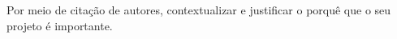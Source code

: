 \justify

\hspace{0.5cm} Por meio de citação de autores, contextualizar e justificar o porquê que o seu projeto é importante.